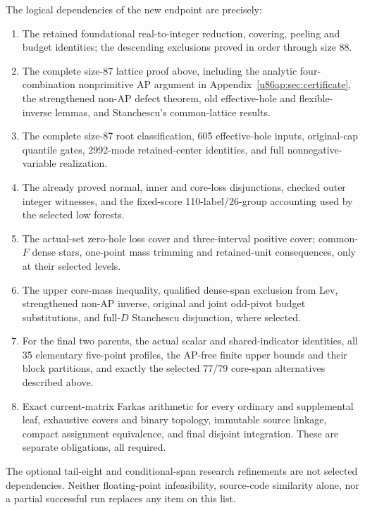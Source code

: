 \documentclass[11pt,a4paper]{article}
\theoremstyle{remark}
\begin{document}
The logical dependencies of the new endpoint are precisely:
\begin{enumerate}
\item The retained foundational real-to-integer reduction, covering,
peeling and budget identities; the descending exclusions proved in order
through size 88.
\item The complete size-87 lattice proof above, including the analytic four-combination
nonprimitive AP argument in Appendix~\ref{u86ap:sec:certificate}, the strengthened non-AP defect theorem,
old effective-hole and flexible-inverse lemmas, and Stanchescu's
common-lattice results.
\item The complete size-87 root classification,
605 effective-hole inputs, original-cap quantile gates, 2992-mode
retained-center identities, and full nonnegative-variable realization.
\item The already proved normal, inner and core-loss disjunctions,
checked outer integer witnesses, and the fixed-score 110-label/26-group
accounting used by the selected low forests.
\item The actual-set zero-hole loss cover and three-interval positive
cover; common-$F$ dense stars, one-point mass trimming and retained-unit
consequences, only at their selected levels.
\item The upper core-mass inequality, qualified dense-span exclusion
from Lev, strengthened non-AP inverse, original and joint odd-pivot
budget substitutions, and full-$D$ Stanchescu disjunction, where selected.
\item For the final two parents, the actual scalar and shared-indicator
identities, all 35 elementary five-point profiles, the AP-free finite
upper bounds and their block partitions, and exactly the selected
77/79 core-span alternatives described above.
\item Exact current-matrix Farkas arithmetic for every ordinary and
supplemental leaf, exhaustive covers and binary topology, immutable
source linkage, compact assignment equivalence, and final disjoint
integration. These are separate obligations, all required.
\end{enumerate}
The optional tail-eight and conditional-span research refinements are
not selected dependencies. Neither floating-point infeasibility,
source-code similarity alone, nor a partial successful run replaces
any item on this list.
\end{document}
